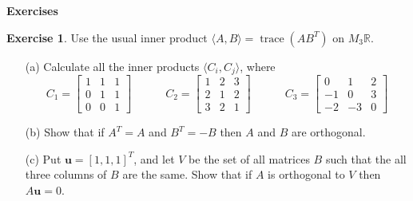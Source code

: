\documentclass{amsart}
\newcommand{\R}         {{\mathbb{R}}}
\newcommand{\trc}       {\operatorname{trace}}
\newcommand{\bsm}       {\left[\begin{smallmatrix}}
\newcommand{\esm}       {\end{smallmatrix}\right]}
\newcommand{\ip}[1]     {\langle #1\rangle}
\newcommand{\vu}        {\mathbf{u}}
\renewcommand{\:}       {\colon}
\theoremstyle{definition}
\newtheorem{exercise}{Exercise}[section]
\begin{document}
\begin{center}
 \Large \textbf{Exercises}
\end{center}

\begin{exercise}
 Use the usual inner product $\ip{A,B}=\trc(AB^T)$ on
 $M_3\R$.  
 \begin{itemize}
  \item[(a)] Calculate all the inner products
   $\ip{C_i,C_j}$, where 
   {\[
    C_1 = \bsm 1&1&1\\0&1&1\\0&0&1 \esm \hspace{3em}
    C_2 = \bsm 1&2&3\\2&1&2\\3&2&1 \esm \hspace{3em}
    C_3 = \bsm 0&1&2\\-1&0&3\\-2&-3&0 \esm
   \]} 
  \item[(b)] Show that if $A^T=A$ and $B^T=-B$ then $A$ and
   $B$ are orthogonal.
  \item[(c)] Put $\vu=[1,1,1]^T$, and let $V$ be the set of all
   matrices $B$ such that the all three columns of $B$ are
   the same.  Show that if $A$ is orthogonal to $V$ then
   $A\vu=0$. 
 \end{itemize}
\end{exercise}
\end{document}
